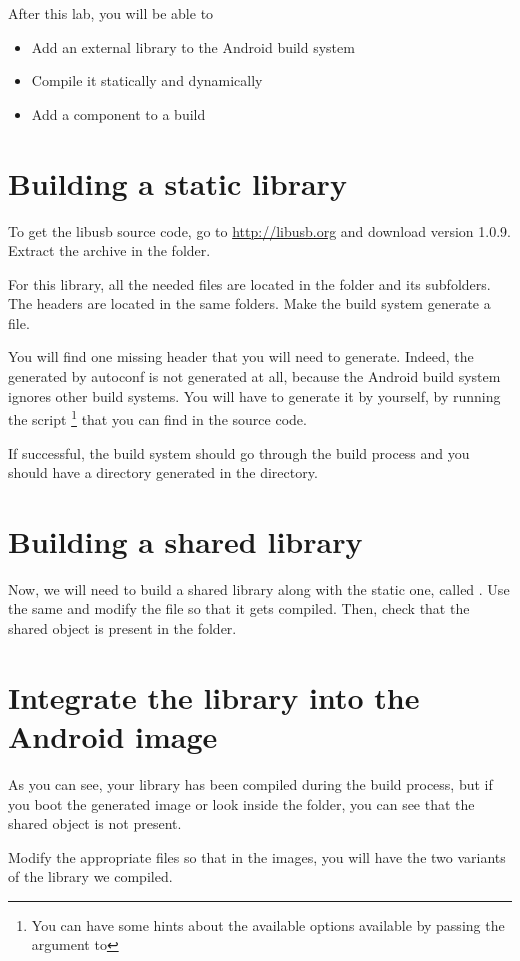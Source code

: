 
After this lab, you will be able to
\begin{itemize}
  \item Add an external library to the Android build system
  \item Compile it statically and dynamically
  \item Add a component to a build
\end{itemize}

\section{Building a static library}

To get the libusb source code, go to \url{http://libusb.org} and
download version 1.0.9. Extract the archive in the
 folder.

For this library, all the needed  files are located in the
 folder and its subfolders. The headers are located in
the same folders. Make the build system generate a
 file.

You will find one missing header that you will need to
generate. Indeed, the  generated by autoconf is not
generated at all, because the Android build system ignores other build
systems. You will have to generate it by yourself, by running the
 script \footnote{You can have some hints about the
  available options available by passing the  argument to
  } that you can find in the  source
code.

If successful, the build system should go through the build process
and you should have a directory generated in the  directory.

\section{Building a shared library}

Now, we will need to build a shared library along with the static one,
called . Use the same  and modify the
 file so that it gets compiled. Then, check that the
shared object is present in the  folder.

\section{Integrate the library into the Android image}

As you can see, your library has been compiled during the build
process, but if you boot the generated image or look inside the
 folder, you can see that
the shared object is not present.

Modify the appropriate files so that in the images, you will have the
two variants of the library we compiled.
